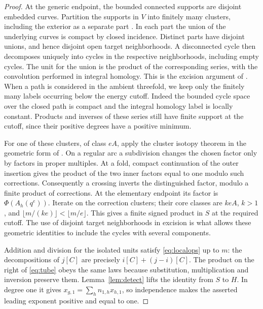 \begin{proof}
At the generic endpoint, the bounded connected supports are disjoint
embedded curves. Partition the supports in $V$ into finitely many
clusters, including the exterior as a separate part
\cite[Propositions~3.18 and~3.21]{DIW}. In each part the union of
the underlying curves is compact by closed incidence. Distinct parts have
disjoint unions, and hence disjoint open target neighborhoods. A
disconnected cycle then decomposes uniquely into cycles in the respective
neighborhoods, including empty cycles. The unit for the union is the
product of the corresponding series, with the convolution performed in
integral homology. This is the excision argument of \cite[\S4]{WueProduct}.
When a path is considered in the ambient threefold, we keep only the
finitely many labels occurring below the energy cutoff. Indeed the
bounded cycle space over the closed path is compact and the integral
homology label is locally constant. Products and inverses of these
series still have finite support at the cutoff, since their positive
degrees have a positive minimum.

For one of these clusters, of class $eA$, apply the cluster isotopy theorem
\cite[Theorem~3.25]{DIW} in the geometric form of
\cite[\S4, proof of Proposition~4.1]{WueProduct}. On a regular arc a
subdivision changes the chosen factor only by factors in proper
multiples. At a fold, compact continuation of the outer insertion gives
the product of the two inner factors equal to one modulo such corrections.
Consequently a crossing inverts the distinguished factor, modulo a
finite product of corrections. At the elementary endpoint its factor is
$\Phi(A_h(q^e))$. Iterate on the correction clusters; their core classes
are $keA$, $k>1$, and $\lfloor m/(ke)\rfloor<\lfloor m/e\rfloor$.
This gives a finite signed product in $S$ at the required cutoff. The
use of disjoint target neighborhoods in excision is what allows these
geometric identities to include the cycles with several components.

Addition and division for the isolated units satisfy
\eqref{eq:localops} up to $m$: the decompositions of $j[C]$ are precisely
$i[C]+(j-i)[C]$. The product on the right of \eqref{eq:tube} obeys
the same laws because substitution, multiplication and inversion
preserve them. Lemma~\ref{lem:detect} lifts the identity from $S$ to $H$.
In degree one it gives $x_{g,1}=\sum_h n_{1,h}x_{h,1}$, so independence
makes the asserted leading exponent positive and equal to one.
\end{proof}

